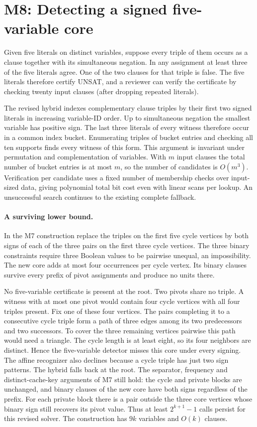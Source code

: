\documentclass[11pt,a4paper]{article}
\begin{document}
\section{M8: Detecting a signed five-variable core}
Given five literals on distinct variables, suppose every triple of them
occurs as a clause together with its simultaneous negation. In any
assignment at least three of the five literals agree. One of the two
clauses for that triple is false. The five literals therefore certify
UNSAT, and a reviewer can verify the certificate by checking twenty
input clauses (after dropping repeated literals).

The revised hybrid indexes complementary clause triples by their first
two signed literals in increasing variable-ID order. Up to simultaneous
negation the smallest variable has positive sign. The last three
literals of every witness therefore occur in a common index bucket.
Enumerating triples of bucket entries and checking all ten supports
finds every witness of this form. This argument is invariant under
permutation and complementation of variables. With $m$ input clauses
the total number of bucket entries is at most $m$, so the number of
candidates is $O(m^3)$. Verification per candidate uses a fixed number
of membership checks over input-sized data, giving polynomial total
bit cost even with linear scans per lookup. An unsuccessful search
continues to the existing complete fallback.

\paragraph{A surviving lower bound.}
In the M7 construction replace the triples on the first five cycle
vertices by both signs of each of the three pairs on the first three
cycle vertices. The three binary constraints require three Boolean
values to be pairwise unequal, an impossibility. The new core adds
at most four occurrences per cycle vertex. Its binary clauses survive
every prefix of pivot assignments and produce no units there.

No five-variable certificate is present at the root. Two pivots share
no triple. A witness with at most one pivot would contain four cycle
vertices with all four triples present. Fix one of these four vertices.
The pairs completing it to a consecutive cycle triple form a path of
three edges among its two predecessors and two successors. To cover
the three remaining vertices pairwise this path would need a triangle.
The cycle length is at least eight, so its four neighbors are distinct.
Hence the five-variable detector misses this core under every signing.
The affine recognizer also declines because a cycle triple has just two
sign patterns. The hybrid falls back at the root. The separator,
frequency and distinct-cache-key arguments of M7 still hold: the cycle
and private blocks are unchanged, and binary clauses of the new core
have both signs regardless of the prefix. For each private block there
is a pair outside the three core vertices whose binary sign still
recovers its pivot value. Thus at least $2^{k+1}-1$ calls persist for
this revised solver. The construction has $9k$ variables and $O(k)$
clauses.
\end{document}
